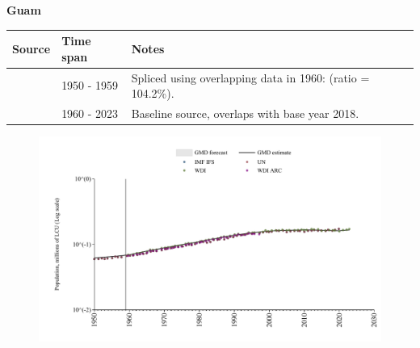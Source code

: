 \documentclass[12pt,a4paper,landscape]{article}
\begin{document}
\begin{adjustbox}{max totalsize={\paperwidth}{\paperheight},center}
\begin{minipage}[t][\textheight][t]{\textwidth}
\vspace*{0.5cm}
{}
\begin{center}
{\Large\bfseries Guam}
\end{center}
\vspace{0.5cm}
\begin{table}[H]
\centering
\small
\begin{tabular}{|l|l|l|}
\hline
\textbf{Source} & \textbf{Time span} & \textbf{Notes} \\
\hline
\rowcolor{white}\cite{IMF_IFS}& 1950 - 1959 &Spliced using overlapping data in 1960: (ratio = 104.2\%).\\
\rowcolor{lightgray}\cite{WDI}& 1960 - 2023 &Baseline source, overlaps with base year 2018.\\
\hline
\end{tabular}
\end{table}
\begin{figure}[H]
\centering
\includegraphics[width=\textwidth,height=0.6\textheight,keepaspectratio]{graphs/GUM_pop.pdf}
\end{figure}
\end{minipage}
\end{adjustbox}
\end{document}
